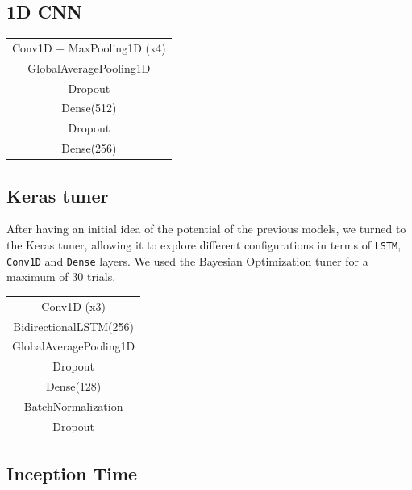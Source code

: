 \documentclass[conference,compsoc,11pt]{IEEEtran}
\begin{document}
\subsection{1D CNN}

\begin{center}
\begin{tabular}{c}
\hline
Conv1D + MaxPooling1D (x4)\\
GlobalAveragePooling1D\\
Dropout\\
Dense(512)\\
Dropout\\
Dense(256)\\
\hline
\end{tabular}
\end{center}

\subsection{Keras tuner}

After having an initial idea of the potential of the previous models, we turned to the Keras tuner, allowing it to explore different configurations in terms of \texttt{LSTM}, \texttt{Conv1D} and \texttt{Dense} layers. We used the Bayesian Optimization tuner for a maximum of 30 trials.

\begin{center}
\begin{tabular}{c}
\hline
Conv1D (x3)\\
BidirectionalLSTM(256)\\
GlobalAveragePooling1D\\
Dropout\\
Dense(128)\\
BatchNormalization\\
Dropout\\
\hline
\end{tabular}
\end{center}

\subsection{Inception Time}
\end{document}
